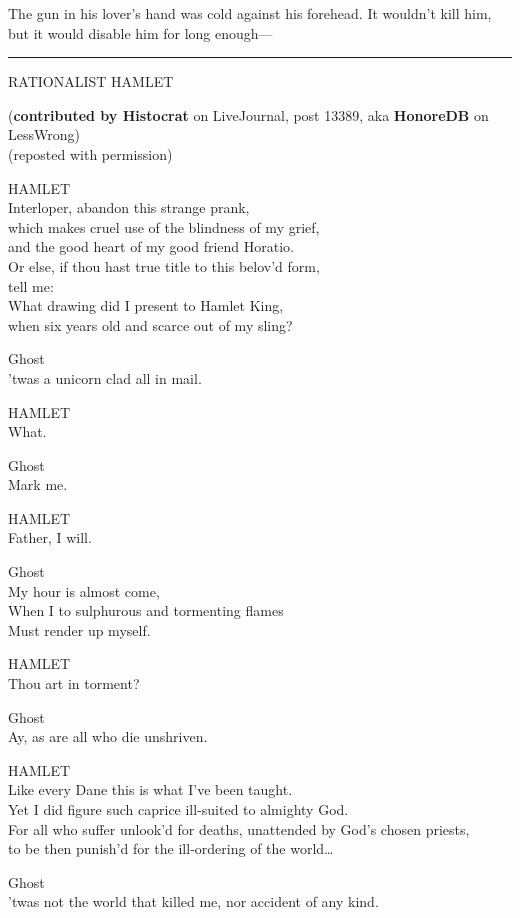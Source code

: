 The gun in his lover's hand was cold against his forehead. It wouldn't
kill him, but it would disable him for long enough---

\begin{center}\rule{3in}{0.4pt}\end{center}

RATIONALIST HAMLET

(\textbf{contributed by Histocrat} on LiveJournal, post 13389, aka
\textbf{HonoreDB} on LessWrong)\\(reposted with permission)

HAMLET\\Interloper, abandon this strange prank,\\which makes cruel use
of the blindness of my grief,\\and the good heart of my good friend
Horatio.\\Or else, if thou hast true title to this belov'd form,\\tell
me:\\What drawing did I present to Hamlet King,\\when six years old and
scarce out of my sling?

Ghost\\'twas a unicorn clad all in mail.

HAMLET\\What.

Ghost\\Mark me.

HAMLET\\Father, I will.

Ghost\\My hour is almost come,\\When I to sulphurous and tormenting
flames\\Must render up myself.

HAMLET\\Thou art in torment?

Ghost\\Ay, as are all who die unshriven.

HAMLET\\Like every Dane this is what I've been taught.\\Yet I did figure
such caprice ill-suited to almighty God.\\For all who suffer unlook'd
for deaths, unattended by God's chosen priests,\\to be then punish'd for
the ill-ordering of the world\ldots{}

Ghost\\'twas not the world that killed me, nor accident of any kind.


